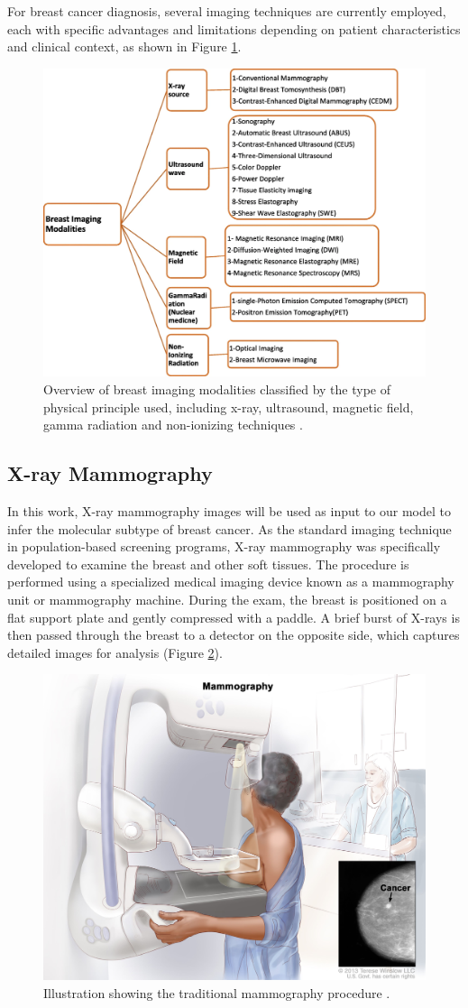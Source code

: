 \documentclass[a4paper,10pt]{book}
\begin{document}
For breast cancer diagnosis, several imaging techniques are currently employed, each with specific advantages and limitations depending on patient characteristics and clinical context, as shown in Figure \ref{fig:breast_cancer_medical}.

\begin{figure}[h!]
    \centering
    \includegraphics[width=0.75\linewidth]{reports//assets/medical_imaging.png}
    \caption{Overview of breast imaging modalities classified by the type of physical principle used, including x-ray, ultrasound, magnetic field, gamma radiation and non-ionizing techniques \cite{iranmakani_review_2020}.}
    \label{fig:breast_cancer_medical}
\end{figure}

\subsection{X-ray Mammography}

In this work, X-ray mammography images will be used as input to our model to infer the molecular subtype of breast cancer. As the standard imaging technique in population-based screening programs, X-ray mammography was specifically developed to examine the breast and other soft tissues. The procedure is performed using a specialized medical imaging device known as a mammography unit or mammography machine. During the exam, the breast is positioned on a flat support plate and gently compressed with a paddle. A brief burst of X-rays is then passed through the breast to a detector on the opposite side, which captures detailed images for analysis (Figure \ref{fig:mammography}).

\begin{figure}[h!]
    \centering
    \includegraphics[width=0.45\linewidth]{reports//assets/mammography.jpg}
    \caption{Illustration showing the traditional mammography procedure \cite{nihDefinitionMammogramNCI2011}.}
    \label{fig:mammography}
\end{figure}
\end{document}
